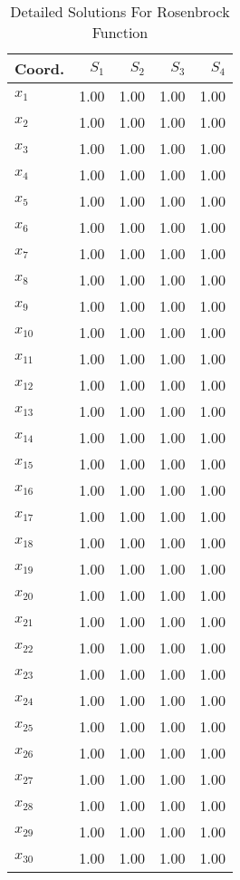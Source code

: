 \begin{table}
\centering
\caption{Detailed Solutions For Rosenbrock Function}
\label{detailedsolutions:rosenbrock30d}
\begin{tabular}{lrrrr}
\toprule
  Coord. &  $S_{1}$ &  $S_{2}$ &  $S_{3}$ &  $S_{4}$ \\
\midrule
 $x_{1}$ &     1.00 &     1.00 &     1.00 &     1.00 \\
 $x_{2}$ &     1.00 &     1.00 &     1.00 &     1.00 \\
 $x_{3}$ &     1.00 &     1.00 &     1.00 &     1.00 \\
 $x_{4}$ &     1.00 &     1.00 &     1.00 &     1.00 \\
 $x_{5}$ &     1.00 &     1.00 &     1.00 &     1.00 \\
 $x_{6}$ &     1.00 &     1.00 &     1.00 &     1.00 \\
 $x_{7}$ &     1.00 &     1.00 &     1.00 &     1.00 \\
 $x_{8}$ &     1.00 &     1.00 &     1.00 &     1.00 \\
 $x_{9}$ &     1.00 &     1.00 &     1.00 &     1.00 \\
$x_{10}$ &     1.00 &     1.00 &     1.00 &     1.00 \\
$x_{11}$ &     1.00 &     1.00 &     1.00 &     1.00 \\
$x_{12}$ &     1.00 &     1.00 &     1.00 &     1.00 \\
$x_{13}$ &     1.00 &     1.00 &     1.00 &     1.00 \\
$x_{14}$ &     1.00 &     1.00 &     1.00 &     1.00 \\
$x_{15}$ &     1.00 &     1.00 &     1.00 &     1.00 \\
$x_{16}$ &     1.00 &     1.00 &     1.00 &     1.00 \\
$x_{17}$ &     1.00 &     1.00 &     1.00 &     1.00 \\
$x_{18}$ &     1.00 &     1.00 &     1.00 &     1.00 \\
$x_{19}$ &     1.00 &     1.00 &     1.00 &     1.00 \\
$x_{20}$ &     1.00 &     1.00 &     1.00 &     1.00 \\
$x_{21}$ &     1.00 &     1.00 &     1.00 &     1.00 \\
$x_{22}$ &     1.00 &     1.00 &     1.00 &     1.00 \\
$x_{23}$ &     1.00 &     1.00 &     1.00 &     1.00 \\
$x_{24}$ &     1.00 &     1.00 &     1.00 &     1.00 \\
$x_{25}$ &     1.00 &     1.00 &     1.00 &     1.00 \\
$x_{26}$ &     1.00 &     1.00 &     1.00 &     1.00 \\
$x_{27}$ &     1.00 &     1.00 &     1.00 &     1.00 \\
$x_{28}$ &     1.00 &     1.00 &     1.00 &     1.00 \\
$x_{29}$ &     1.00 &     1.00 &     1.00 &     1.00 \\
$x_{30}$ &     1.00 &     1.00 &     1.00 &     1.00 \\
\bottomrule
\end{tabular}
\end{table}

